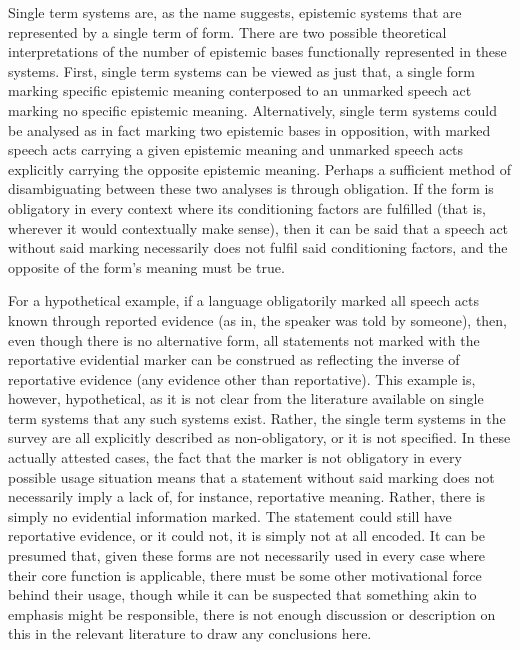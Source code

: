 Single term systems are, as the name suggests, epistemic systems that are represented by a single term of form. There are two possible theoretical interpretations of the number of epistemic bases functionally represented in these systems. First, single term systems can be viewed as just that, a single form marking specific epistemic meaning conterposed to an unmarked speech act marking no specific epistemic meaning. Alternatively, single term systems could be analysed as in fact marking two epistemic bases in opposition, with marked speech acts carrying a given epistemic meaning and unmarked speech acts explicitly carrying the opposite epistemic meaning. Perhaps a sufficient method of disambiguating between these two analyses is through obligation. If the form is obligatory in every context where its conditioning factors are fulfilled (that is, wherever it would contextually make sense), then it can be said that a speech act without said marking necessarily does not fulfil said conditioning factors, and the opposite of the form's meaning must be true.

For a hypothetical example, if a language obligatorily marked all speech acts known through reported evidence (as in, the speaker was told by someone), then, even though there is no alternative form, all statements not marked with the reportative evidential marker can be construed as reflecting the inverse of reportative evidence (any evidence other than reportative). This example is, however, hypothetical, as it is not clear from the literature available on single term systems that any such systems exist. Rather, the single term  systems in the survey are all explicitly described as non-obligatory, or it is not specified. In these actually attested cases, the fact that the marker is not obligatory in every possible usage situation means that a statement without said marking does not necessarily imply a lack of, for instance, reportative meaning. Rather, there is simply no evidential information marked. The statement could still have reportative evidence, or it could not, it is simply not at all encoded. It can be presumed that, given these forms are not necessarily used in every case where their core function is applicable, there must be some other motivational force behind their usage, though while it can be suspected that something akin to emphasis might be responsible, there is not enough discussion or description on this in the relevant literature to draw any conclusions here.

